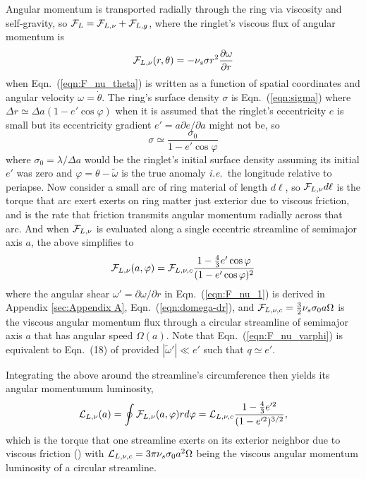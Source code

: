 \documentclass[preprint]{aastex62}
\begin{document}
Angular momentum is transported radially through the ring via viscosity and self-gravity, 
so ${\cal F}_L={\cal F}_{L,\nu} + {\cal F}_{L,g}$,
where the ringlet's viscous flux of angular momentum is
\begin{equation}
    \label{eqn:F_nu_1}
    {\cal F}_{L,\nu}(r, \theta) = -\nu_s \sigma r^2\frac{\partial\omega}{\partial r}
\end{equation}
when Eqn.\ (\ref{eqn:F_nu_theta}) is written as a function of spatial coordinates and
angular velocity $\omega=\dot{\theta}$. 
The ring's surface density $\sigma$ is Eqn.\ (\ref{eqn:sigma}) where $\Delta r\simeq\Delta a(1-e'\cos\varphi)$
when it is assumed that the ringlet's eccentricity $e$ is small but its
eccentricity gradient $e'=a\partial e/\partial a$ might not be, so 
\begin{equation}
    \label{eqn:sigma2}
    \sigma \simeq \frac{\sigma_0}{1-e'\cos\varphi}
\end{equation}
where $\sigma_0 = \lambda/\Delta a$ would be the ringlet's initial surface density assuming
its initial $e'$ was zero and $\varphi=\theta-\tilde{\omega}$ is the true anomaly 
{\it i.e.}\ the longitude relative to periapse.
Now consider a small arc of  ring material of length $d\ell$, 
so ${\cal F}_{L,\nu}d\ell$ is the torque that arc exert exerts on
ring matter just exterior due to viscous friction,
and is the rate that friction transmits angular momentum radially across that arc.
And when ${\cal F}_{L,\nu}$ is evaluated along a single eccentric streamline of semimajor axis $a$, 
the above simplifies to
\begin{equation}
    \label{eqn:F_nu_varphi}
    {\cal F}_{L,\nu}(a, \varphi) = {\cal F}_{L,\nu,c}\frac{1-\frac{4}{3}e'\cos\varphi}{(1-e'\cos\varphi)^2}
\end{equation}
where the angular shear $\omega'=\partial\omega/\partial r$ in Eqn.\ (\ref{eqn:F_nu_1})
is derived in Appendix \ref{sec:Appendix A}, Eqn.\ (\ref{eqn:domega-dr}), and
${\cal F}_{L,\nu,c}=\frac{3}{2}\nu_s\sigma_0a\Omega$ is the viscous angular momentum flux through a
circular streamline of semimajor axis $a$ that has angular speed $\Omega(a)$.
Note that Eqn.\ (\ref{eqn:F_nu_varphi}) is equivalent to Eqn.\ (18) of \cite{BGT82}
provided $|\tilde{\omega}'|\ll e'$ such that $q\simeq e'$. 

Integrating the above around the streamline's circumference then yields its angular momentumum luminosity,
\begin{equation}
    \label{eqn:L_nu}
    {\cal L}_{L,\nu}(a) = \oint {\cal F}_{L,\nu}(a, \varphi)rd\varphi = {\cal L}_{L,\nu,c}\frac{1-\frac{4}{3}e'^2}{(1-e'^2)^{3/2}},
\end{equation}
which is the torque that one streamline exerts on its exterior neighbor due to viscous friction
(\citealt{BGT82}) with ${\cal L}_{L,\nu,c}=3\pi\nu_s\sigma_0a^2\Omega$
being the viscous angular momentum luminosity of a circular streamline.
\end{document}
